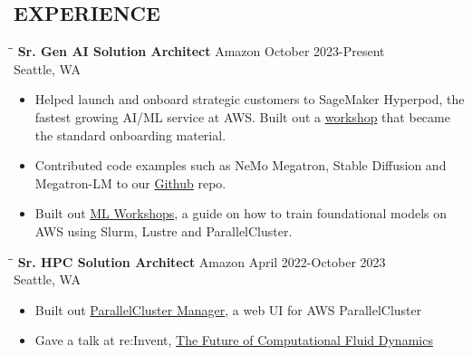 \documentclass{res}
\begin{document}
\begin{resume}
\section{EXPERIENCE}
\vspace{-0.10in}
 \begin{tabbing}
   \hspace{2.5in}\= \hspace{2.6in}\= \kill %
    {\bf Sr. Gen AI Solution Architect} \>Amazon     \>October 2023-Present\\
                             \>Seattle, WA
   \end{tabbing}\vspace{-10pt}      %
   \begin{itemize}
   \setlength\itemsep{0em}
    \item Helped launch and onboard strategic customers to SageMaker Hyperpod, the fastest growing AI/ML service at AWS. Built out a \href{https://catalog.workshops.aws/sagemaker-hyperpod}{workshop} that became the standard onboarding material.
    \item Contributed code examples such as NeMo Megatron, Stable Diffusion and Megatron-LM to our \href{https://github.com/aws-samples/awsome-distributed-training/}{Github} repo.
    \item Built out \href{https://mlworkshops.com}{ML Workshops}, a guide on how to train foundational models on AWS using Slurm, Lustre and ParallelCluster.
    \end{itemize}
\vspace{-0.10in}
 \begin{tabbing}
   \hspace{2.5in}\= \hspace{2.6in}\= \kill %
    {\bf Sr. HPC Solution Architect} \>Amazon     \>April 2022-October 2023\\
                             \>Seattle, WA
   \end{tabbing}\vspace{-10pt}      %
   \begin{itemize}
   \setlength\itemsep{0em}
\item Built out \href{https://pcluster.cloud/}{ParallelCluster Manager}, a web UI for AWS ParallelCluster
\item Gave a talk at re:Invent, \href{https://swsmith.cc/slides/CMP208-CFD-in-Cloud.pdf}{The Future of Computational Fluid Dynamics}

\end{itemize}
\end{resume}
\end{document}
